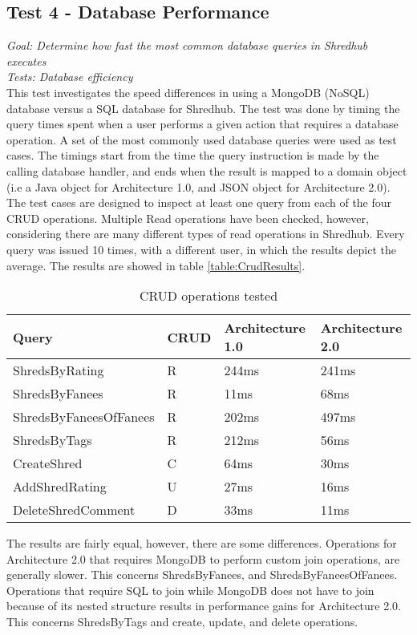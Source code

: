 %

\subsection{Test 4 - Database Performance}
\textit{Goal: Determine how fast the most common database queries in Shredhub executes}\\
\textit{Tests: Database efficiency}\\
This test investigates the speed differences in using a MongoDB (NoSQL) database versus a SQL database for Shredhub. The test was done by timing the query times spent when a user performs a given action that requires a database operation. A set of the most commonly used database queries were used as test cases. The timings start from the time the query instruction is made by the calling database handler, and ends when the result is mapped to a domain object (i.e a Java object for Architecture 1.0, and JSON object for Architecture 2.0). The test cases are designed to inspect at least one query from each of the four CRUD operations. Multiple Read operations have been checked, however, considering there are many different types of read operations in Shredhub. Every query was issued 10 times, with a different user, in which the results depict the average. The results are showed in table \vref{table:CrudResults}. 
\begin{table}
\centering
    \begin{tabular}{| l | l | l | l |}
    \hline
	Query & CRUD & Architecture 1.0  & Architecture 2.0 \\ \hline
	ShredsByRating & R & 244ms & 241ms \\ \hline
	ShredsByFanees & R & 11ms & 68ms \\ \hline
	ShredsByFaneesOfFanees & R & 202ms & 497ms \\ \hline
       ShredsByTags & R & 212ms & 56ms \\ \hline
	CreateShred & C & 64ms & 30ms \\ \hline
	AddShredRating & U & 27ms & 16ms \\ \hline
       DeleteShredComment & D & 33ms & 11ms \\ \hline
    \end{tabular}
    \caption{CRUD operations tested}
	\label{table:CrudResults} 
\end{table}
The results are fairly equal, however, there are some differences. Operations for Architecture 2.0 that requires MongoDB to perform custom join operations, are generally slower. This concerns ShredsByFanees, and ShredsByFaneesOfFanees. Operations that require SQL to join while MongoDB does not have to join because of its nested structure results in performance gains for Architecture 2.0. This concerns ShredsByTags and create, update, and delete operations. 


